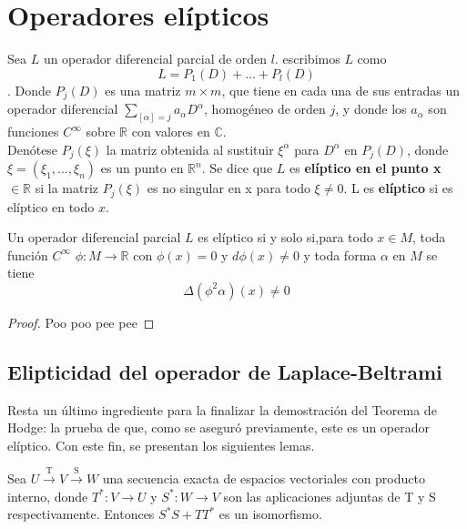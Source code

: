 \section{Operadores elípticos}%
%
\begin{defi}
Sea $L$ un operador diferencial parcial de orden $l$. escribimos $L$ como
\[L = P_1(D) + \ldots + P_l(D)\].
Donde $P_j(D)$ es una matriz $m \times m$, que tiene en cada una de sus entradas un operador diferencial $\sum\limits_{[\alpha] = j}a_\alpha D^\alpha$, homogéneo de orden $j$, y donde los $a_\alpha$ son funciones $C^\infty$ sobre $\mathbb{R}$ con valores en $\mathbb{C}$.\\
Denótese $P_j(\xi)$ la matriz obtenida al sustituir $\xi^\alpha$ para $D^\alpha$ en $P_j(D)$, donde $\xi = (\xi_1, \ldots, \xi_n)$ es un punto en $\mathbb{R}^n$. Se dice que $L$ es \textbf{elíptico en el punto x} $\in \mathbb{R}$ si la matriz $P_j(\xi)$ es no singular en x para todo $\xi \neq 0$. L es \textbf{elíptico} si es elíptico en todo $x$.
\end{defi}


\begin{lem} Un operador diferencial parcial $L$ es elíptico si y solo si,para todo $x \in M$, toda función $C^\infty$ $\phi\colon M \to \mathbb{R}$ con $\phi(x) = 0$ y $d\phi(x) \neq 0$ y toda forma $\alpha$ en $M$ se tiene
\begin{equation}
    \Delta(\phi^2\alpha)(x) \neq 0
\end{equation}
\end{lem}
\begin{proof}
Poo poo pee pee
\end{proof}








%
\subsection{Elipticidad del operador de Laplace-Beltrami}%

Resta un último ingrediente para la finalizar la demostración del Teorema de Hodge: la prueba de que, como se aseguró previamente, este es un operador elíptico. Con este fin, se presentan los siguientes lemas.\\
\begin{lem}
Sea  \( U \xrightarrow{\text{T}} V \xrightarrow{\text{S}} W\) una secuencia exacta de espacios vectoriales con producto interno, donde $T^{*}\colon V \to U$ y $S^{*}\colon W \to V$ son las aplicaciones adjuntas de T y S respectivamente. Entonces \(S^{*}S+TT^{*}\) es un isomorfismo.
\end{lem}

